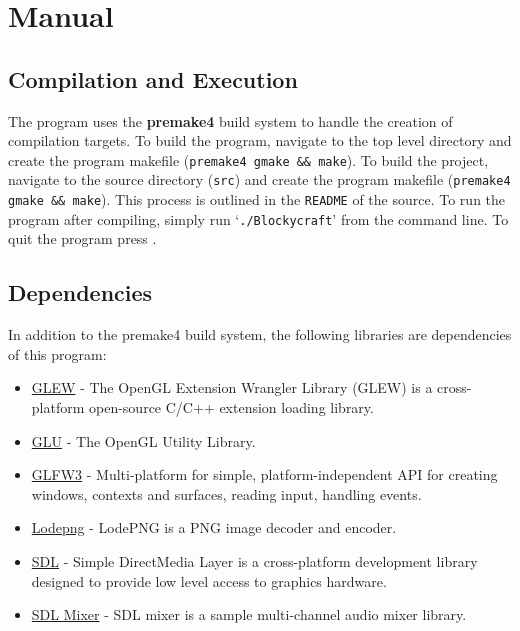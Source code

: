 \documentclass[a4paper,11pt,titlepage]{scrartcl}
\begin{document}

\section{Manual}
\subsection{Compilation and Execution}
The program uses the \textbf{premake4} build system to handle the creation of compilation targets.  To build the program, navigate to the top level directory and create the program makefile (\texttt{premake4 gmake \&\& make}).  To build the project, navigate to the source directory (\texttt{src}) and create the program makefile (\texttt{premake4 gmake \&\& make}).
This process is outlined in the \texttt{README} of the source.  To run the program after compiling, simply run `\texttt{./Blockycraft}' from the command line.  To quit the program press .

\subsection{Dependencies}
In addition to the premake4 build system, the following libraries are dependencies of this program: 
\begin{itemize}
	\item \href{https://github.com/nigels-com/glew}{GLEW} - The OpenGL Extension Wrangler Library (GLEW) is a cross-platform open-source C/C++ extension loading library.
	\item \href{https://www.opengl.org/resources/libraries/}{GLU} - The OpenGL Utility Library.
	\item \href{http://www.glfw.org/docs/latest/}{GLFW3} - Multi-platform for simple, platform-independent API for creating windows, contexts and surfaces, reading input, handling events.
	\item \href{http://lodev.org/lodepng/}{Lodepng} - LodePNG is a PNG image decoder and encoder.
	\item \href{https://www.libsdl.org/}{SDL} - Simple DirectMedia Layer is a cross-platform development library designed to provide low level access to graphics hardware.
	\item \href{https://www.libsdl.org/projects/SDL_mixer/}{SDL Mixer} - SDL mixer is a sample multi-channel audio mixer library. 
\end{itemize}
\end{document}
